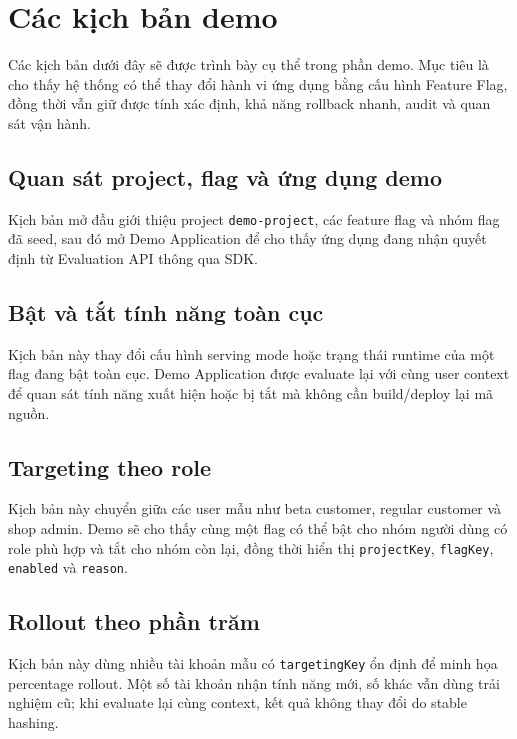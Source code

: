 \section{Các kịch bản demo}

Các kịch bản dưới đây sẽ được trình bày cụ thể trong phần demo. Mục tiêu là cho thấy hệ thống có thể thay đổi hành vi ứng dụng bằng cấu hình Feature Flag, đồng thời vẫn giữ được tính xác định, khả năng rollback nhanh, audit và quan sát vận hành.

\subsection{Quan sát project, flag và ứng dụng demo}

Kịch bản mở đầu giới thiệu project \texttt{demo-project}, các feature flag và nhóm flag đã seed, sau đó mở Demo Application để cho thấy ứng dụng đang nhận quyết định từ Evaluation API thông qua SDK.

\subsection{Bật và tắt tính năng toàn cục}

Kịch bản này thay đổi cấu hình serving mode hoặc trạng thái runtime của một flag đang bật toàn cục. Demo Application được evaluate lại với cùng user context để quan sát tính năng xuất hiện hoặc bị tắt mà không cần build/deploy lại mã nguồn.

\subsection{Targeting theo role}

Kịch bản này chuyển giữa các user mẫu như beta customer, regular customer và shop admin. Demo sẽ cho thấy cùng một flag có thể bật cho nhóm người dùng có role phù hợp và tắt cho nhóm còn lại, đồng thời hiển thị \texttt{projectKey}, \texttt{flagKey}, \texttt{enabled} và \texttt{reason}.

\subsection{Rollout theo phần trăm}

Kịch bản này dùng nhiều tài khoản mẫu có \texttt{targetingKey} ổn định để minh họa percentage rollout. Một số tài khoản nhận tính năng mới, số khác vẫn dùng trải nghiệm cũ; khi evaluate lại cùng context, kết quả không thay đổi do stable hashing.


